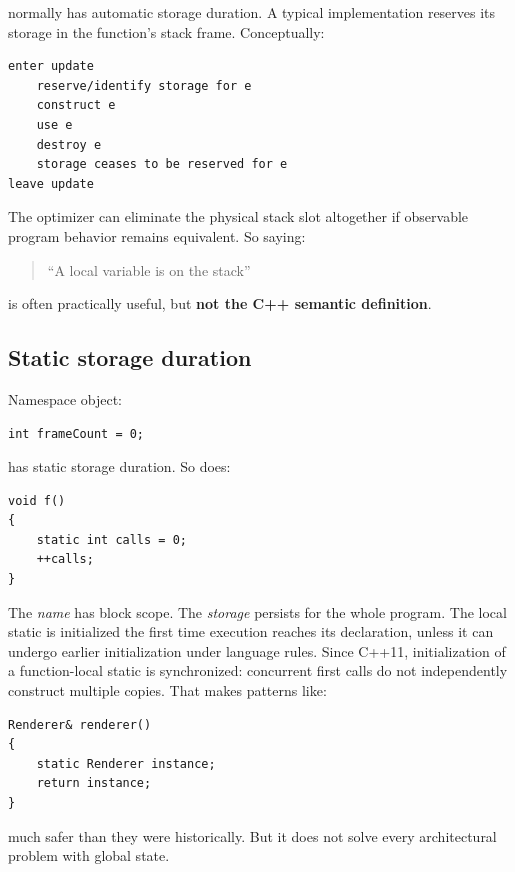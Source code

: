  normally has automatic storage duration. A typical implementation reserves its storage in the function's stack frame. Conceptually:

\begin{verbatim}
enter update
    reserve/identify storage for e
    construct e
    use e
    destroy e
    storage ceases to be reserved for e
leave update
\end{verbatim}

The optimizer can eliminate the physical stack slot altogether if observable program behavior remains equivalent. So saying:

\begin{quote}
``A local variable is on the stack''
\end{quote}

is often practically useful, but \textbf{not the C++ semantic definition}.

\subsection{Static storage duration}\label{01-foundations-i-ch002-static-storage-duration}

\hypertarget{01-foundations-i-ch002-static-storage-duration}{}

Namespace object:

\begin{verbatim}
int frameCount = 0;
\end{verbatim}

has static storage duration. So does:

\begin{verbatim}
void f()
{
    static int calls = 0;
    ++calls;
}
\end{verbatim}

The \emph{name}  has block scope. The \emph{storage} persists for the whole program. The local static is initialized the first time execution reaches its declaration, unless it can undergo earlier initialization under language rules. Since C++11, initialization of a function-local static is synchronized: concurrent first calls do not independently construct multiple copies. That makes patterns like:

\begin{verbatim}
Renderer& renderer()
{
    static Renderer instance;
    return instance;
}
\end{verbatim}

much safer than they were historically. But it does not solve every architectural problem with global state.

